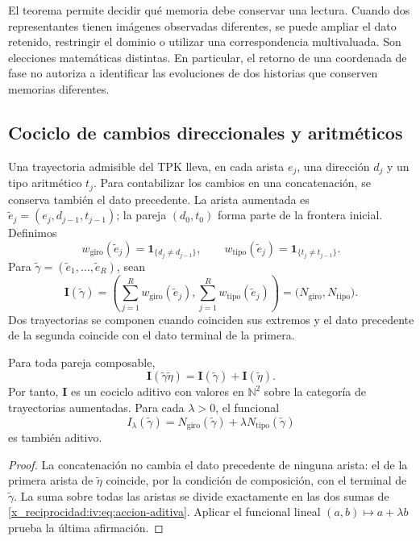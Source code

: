El teorema permite decidir qué memoria debe conservar una
lectura. Cuando dos representantes tienen imágenes observadas
diferentes, se puede ampliar el dato retenido, restringir
el dominio o utilizar una correspondencia multivaluada.
Son elecciones matemáticas distintas. En particular, el
retorno de una coordenada de fase no autoriza a identificar
las evoluciones de dos historias que conserven memorias
diferentes.

\subsection{Cociclo de cambios direccionales y aritméticos}

Una trayectoria admisible del TPK lleva, en cada arista
\(e_j\), una dirección \(d_j\) y un tipo aritmético
\(t_j\). Para contabilizar los cambios en una concatenación,
se conserva también el dato precedente. La arista aumentada es
\(\widetilde e_j=(e_j,d_{j-1},t_{j-1})\); la pareja
\((d_0,t_0)\) forma parte de la frontera inicial. Definimos
\[
 w_{\mathrm{giro}}(\widetilde e_j)
       =\mathbf1_{\{d_j\ne d_{j-1}\}},\qquad
 w_{\mathrm{tipo}}(\widetilde e_j)
       =\mathbf1_{\{t_j\ne t_{j-1}\}}.
\]
Para \(\widetilde\gamma=(\widetilde e_1,\ldots,
\widetilde e_R)\), sean
\begin{equation}
 \mathbf I(\widetilde\gamma)=
 \left(\sum_{j=1}^R w_{\mathrm{giro}}(\widetilde e_j),
       \sum_{j=1}^R w_{\mathrm{tipo}}(\widetilde e_j)\right)
 =\bigl(N_{\mathrm{giro}},N_{\mathrm{tipo}}\bigr).
 \label{x_reciprocidad:iv:eq:cociclo-accion}
\end{equation}
Dos trayectorias se componen cuando coinciden sus extremos
y el dato precedente de la segunda coincide con el dato
terminal de la primera.

\begin{proposition}
\label{x_reciprocidad:iv:prop:accion-aditiva}
Para toda pareja composable,
\begin{equation}
 \mathbf I(\widetilde\gamma\widetilde\eta)
 =\mathbf I(\widetilde\gamma)+\mathbf I(\widetilde\eta).
 \label{x_reciprocidad:iv:eq:accion-aditiva}
\end{equation}
Por tanto, \(\mathbf I\) es un cociclo aditivo con valores
en \(\mathbb N^2\) sobre la categoría de trayectorias
aumentadas. Para cada \(\lambda>0\), el funcional
\[
 I_\lambda(\widetilde\gamma)
 =N_{\mathrm{giro}}(\widetilde\gamma)
      +\lambda N_{\mathrm{tipo}}(\widetilde\gamma)
\]
es también aditivo.
\end{proposition}
\begin{proof}
La concatenación no cambia el dato precedente de ninguna
arista: el de la primera arista de \(\widetilde\eta\)
coincide, por la condición de composición, con el terminal
de \(\widetilde\gamma\). La suma sobre todas las aristas
se divide exactamente en las dos sumas de
\eqref{x_reciprocidad:iv:eq:accion-aditiva}. Aplicar el funcional lineal
\((a,b)\mapsto a+\lambda b\) prueba la última afirmación.
\end{proof}

